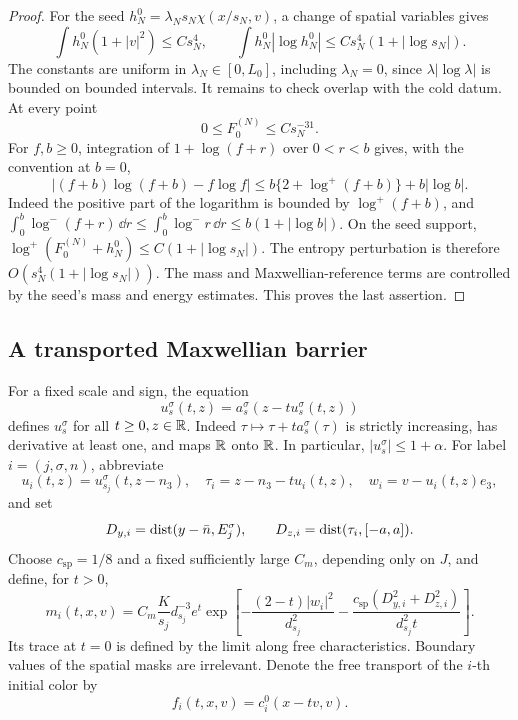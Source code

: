 \begin{proof}
For the seed \(h_N^0=\lambda_Ns_N\chi(x/s_N,v)\), a change of spatial
variables gives
\[
 \int h_N^0(1+|v|^2)\le Cs_N^4,\qquad
 \int h_N^0|\log h_N^0|
       \le Cs_N^4(1+|\log s_N|).
\]
The constants are uniform in \(\lambda_N\in[0,L_0]\), including
\(\lambda_N=0\), since \(\lambda|\log\lambda|\) is bounded on
bounded intervals.
It remains to check overlap with the cold datum.  At every point
\[
 0\le F_0^{(N)}\le C s_N^{-31}.
\]
For \(f,b\ge0\), integration of \(1+\log(f+r)\) over \(0<r<b\)
gives, with the convention at \(b=0\),
\[
 |(f+b)\log(f+b)-f\log f|
 \le b\{2+\log^+(f+b)\}+b|\log b|.
\]
Indeed the positive part of the logarithm is bounded by
\(\log^+(f+b)\), and
\(\int_0^b\log^-(f+r)\,\dd r
 \le\int_0^b\log^-r\,\dd r\le b(1+|\log b|)\).
On the seed support,
\(\log^+(F_0^{(N)}+h_N^0)\le C(1+|\log s_N|)\).
The entropy perturbation is therefore
\(O(s_N^4(1+|\log s_N|))\).  The mass and Maxwellian-reference terms
are controlled by the seed's mass and energy estimates.  This
proves the last assertion.
\end{proof}

\subsection{A transported Maxwellian barrier}

For a fixed scale and sign, the equation
\begin{equation}
 u_s^\sigma(t,z)=a_s^\sigma(z-tu_s^\sigma(t,z))
 \label{jet:scalar-flow}
\end{equation}
defines \(u_s^\sigma\) for all \(t\ge0,z\in\mathbb R\).  Indeed
\(\tau\mapsto\tau+t a_s^\sigma(\tau)\) is strictly increasing,
has derivative at least one, and maps \(\mathbb R\) onto \(\mathbb R\).
In particular, \(|u_s^\sigma|\le1+\alpha\).
For label \(i=(j,\sigma,n)\), abbreviate
\[
 u_i(t,z)=u_{s_j}^\sigma(t,z-n_3),\quad
 \tau_i=z-n_3-tu_i(t,z),\quad w_i=v-u_i(t,z)e_3,
\]
and set
\[
 D_{y,i}=\operatorname{dist}(y-\bar n,E_j^\sigma),\qquad
 D_{z,i}=\operatorname{dist}(\tau_i,[-a,a]).
\]
Choose \(c_{\mathrm{sp}}=1/8\) and a fixed sufficiently large
\(C_m\), depending only on \(J\), and define, for \(t>0\),
\begin{equation}
 m_i(t,x,v)=
 C_m\frac K{s_j}d_{s_j}^{-3} e^t
 \exp\left[-\frac{(2-t)|w_i|^2}{d_{s_j}^2}
 -\frac{c_{\mathrm{sp}}(D_{y,i}^2+D_{z,i}^2)}
              {d_{s_j}^2t}\right].
 \label{jet:majorant}
\end{equation}
Its trace at \(t=0\) is defined by the limit along free
characteristics.  Boundary values of the spatial masks are
irrelevant.  Denote the free transport of the \(i\)-th initial
color by
\[
 f_i(t,x,v)=c_i^0(x-tv,v).
\]

